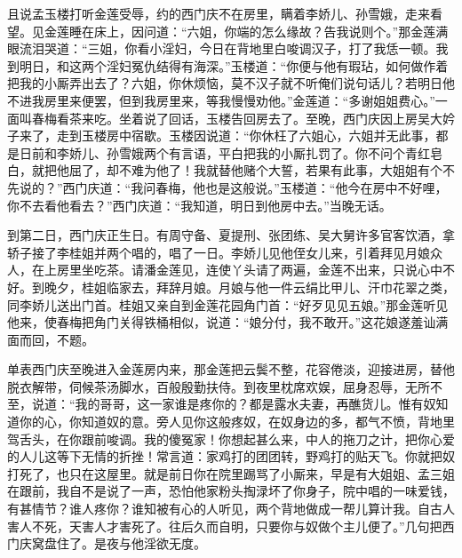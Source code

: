且说孟玉楼打听金莲受辱，约的西门庆不在房里，瞒着李娇儿、孙雪娥，走来看望。见金莲睡在床上，因问道：“六姐，你端的怎么缘故？告我说则个。”那金莲满眼流泪哭道：“三姐，你看小淫妇，今日在背地里白唆调汉子，打了我恁一顿。我到明日，和这两个淫妇冤仇结得有海深。”玉楼道：“你便与他有瑕玷，如何做作着把我的小厮弄出去了？六姐，你休烦恼，莫不汉子就不听俺们说句话儿？若明日他不进我房里来便罢，但到我房里来，等我慢慢劝他。”金莲道：“多谢姐姐费心。”一面叫春梅看茶来吃。坐着说了回话，玉楼告回房去了。至晚，西门庆因上房吴大妗子来了，走到玉楼房中宿歇。玉楼因说道：“你休枉了六姐心，六姐并无此事，都是日前和李娇儿、孙雪娥两个有言语，平白把我的小厮扎罚了。你不问个青红皂白，就把他屈了，却不难为他了！我就替他赌个大誓，若果有此事，大姐姐有个不先说的？”西门庆道：“我问春梅，他也是这般说。”玉楼道：“他今在房中不好哩，你不去看他看去？”西门庆道：“我知道，明日到他房中去。”当晚无话。

到第二日，西门庆正生日。有周守备、夏提刑、张团练、吴大舅许多官客饮酒，拿轿子接了李桂姐并两个唱的，唱了一日。李娇儿见他侄女儿来，引着拜见月娘众人，在上房里坐吃茶。请潘金莲见，连使丫头请了两遍，金莲不出来，只说心中不好。到晚夕，桂姐临家去，拜辞月娘。月娘与他一件云绢比甲儿、汗巾花翠之类，同李娇儿送出门首。桂姐又亲自到金莲花园角门首：“好歹见见五娘。”那金莲听见他来，使春梅把角门关得铁桶相似，说道：“娘分付，我不敢开。”这花娘遂羞讪满面而回，不题。

单表西门庆至晚进入金莲房内来，那金莲把云鬓不整，花容倦淡，迎接进房，替他脱衣解带，伺候茶汤脚水，百般殷勤扶侍。到夜里枕席欢娱，屈身忍辱，无所不至，说道：“我的哥哥，这一家谁是疼你的？都是露水夫妻，再醮货儿。惟有奴知道你的心，你知道奴的意。旁人见你这般疼奴，在奴身边的多，都气不愤，背地里驾舌头，在你跟前唆调。我的傻冤家！你想起甚么来，中人的拖刀之计，把你心爱的人儿这等下无情的折挫！常言道：家鸡打的团团转，野鸡打的贴天飞。你就把奴打死了，也只在这屋里。就是前日你在院里踢骂了小厮来，早是有大姐姐、孟三姐在跟前，我自不是说了一声，恐怕他家粉头掏渌坏了你身子，院中唱的一味爱钱，有甚情节？谁人疼你？谁知被有心的人听见，两个背地做成一帮儿算计我。自古人害人不死，天害人才害死了。往后久而自明，只要你与奴做个主儿便了。”几句把西门庆窝盘住了。是夜与他淫欲无度。

